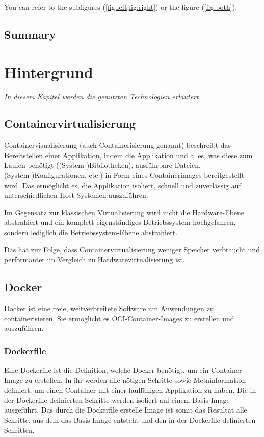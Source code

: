 \documentclass[
	12pt,
	a4paper,
	printlength,
	bibliography=totoc,
	chapterprefix,
	headings=openright,
	numbers=endperiod,
	parskip=half,
	twoside
 ]{scrreprt}
\begin{document}
You can refer to the subfigures (\cref{fig:left,fig:right}) or the figure (\cref{fig:both}).

\section*{Summary}

\lipsum[2]

\chapter{Hintergrund}
\label{cha:background}

\textit{In diesem Kapitel werden die genutzten Technologien erläutert}


\section{Containervirtualisierung}

Containervisualisierung (auch Containerisierung genannt) beschreibt das Bereitstellen einer Applikation, indem die Applikation und alles, was diese zum Laufen benötigt ((System-)Bibliotheken), ausführbare Dateien, (System-)Konfigurationen, etc.) in Form eines Containerimages bereitgestellt wird. Das ermöglicht es, die Applikation isoliert, schnell und zuverlässig auf unterschiedlichen Host-Systemen auszuführen. 

Im Gegensatz zur klassischen Virtualisierung wird nicht die Hardware-Ebene abstrahiert und ein komplett eigenständiges Betriebssystem hochgefahren, sondern lediglich die Betriebssystem-Ebene abstrahiert. 

Das hat zur Folge, dass Containervirtualisierung weniger Speicher verbraucht und performanter im Vergleich zu Hardwarevirtualisierung ist. 


\section{Docker}

Docker ist eine freie, weitverbreitete Software um Anwendungen zu containerisieren. Sie ermöglicht es OCI-Container-Images zu erstellen und auszuführen. 

\subsection{Dockerfile}

Eine Dockerfile ist die Definition, welche Docker benötigt, um ein Container-Image zu erstellen. In ihr werden alle nötigen Schritte sowie Metainformation definiert, um einen Container mit einer lauffähigen Applikation zu haben. Die in der Dockerfile definierten Schritte werden isoliert auf einem Basis-Image ausgeführt. Das durch die Dockerfile erstelle Image ist somit das Resultat alle Schritte, aus dem das Basis-Image entsteht und den in der Dockerfile definierten Schritten.
\end{document}
